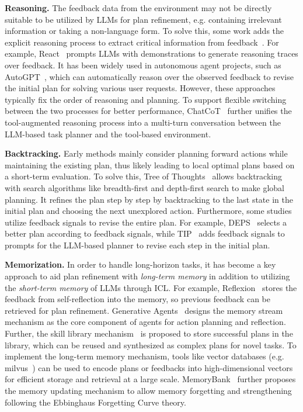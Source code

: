 {{{{{\textbf{Reasoning.}
The feedback data from the environment may not be directly suitable to be utilized by LLMs for plan refinement, e.g. containing irrelevant information or taking a non-language form. To solve this, some work adds the explicit reasoning process to extract critical information from feedback~\cite{Yao-2022-arXiv-react, Chen-2023-arXiv-chatcot}. For example, React~\cite{Yao-2022-arXiv-react} prompts LLMs with demonstrations to generate reasoning traces over feedback. It has been widely used in autonomous agent projects, such as AutoGPT~\cite{AutoGPT}, which can automatically reason over the observed feedback to revise the initial plan for solving various user requests. However, these approaches typically fix the order of reasoning and planning. To support flexible switching between the two processes for better performance, ChatCoT~\cite{Chen-2023-arXiv-chatcot} further unifies the tool-augmented reasoning process into a multi-turn conversation between the LLM-based task planner and the tool-based environment.

\textbf{Backtracking.}
Early methods mainly consider planning forward actions while maintaining the existing plan, thus likely leading to local optimal plans based on a short-term evaluation. To solve this, Tree of Thoughts~\cite{Yao-2023-arXiv-tree} allows backtracking with search algorithms like breadth-first and depth-first search to make global planning. It refines the plan step by step by backtracking to the last state in the initial plan and choosing the next unexplored action. Furthermore, some studies~\cite{Wang-2023-arXiv-describe, Lu-2023-arXiv-multimodal} utilize feedback signals to revise the entire plan. For example, DEPS~\cite{Wang-2023-arXiv-describe} selects a better plan according to feedback signals, while TIP~\cite{Lu-2023-arXiv-multimodal} adds feedback signals to prompts for the LLM-based planner to revise each step in the initial plan.

\textbf{Memorization.}
In order to handle long-horizon tasks, it has become a key approach to aid plan refinement with \emph{long-term memory} in addition to utilizing the \emph{short-term memory} of LLMs through ICL. For example, Reflexion~\cite{Shinn-2023-arXiv-Reflexion} stores the feedback from self-reflection into the memory, so previous feedback can be retrieved for plan refinement. Generative Agents~\cite{Park-arxiv-2023-Generative} designs the memory stream mechanism as the core component of agents for action planning and reflection. Further, the skill library mechanism~\cite{Wang-2023-arXiv-voyager, Sun-2023-arXiv-adaplanner} is proposed to store successful plans in the library, which can be reused and synthesized as complex plans for novel tasks. To implement the long-term memory mechanism, tools like vector databases (e.g. milvus~\cite{Wang-2021-ICDM-Milvus}) can be used to encode plans or feedbacks into high-dimensional vectors for efficient storage and retrieval at a large scale. MemoryBank~\cite{Zhong-2023-arxiv-MemoryBank} further proposes the memory updating mechanism to allow memory forgetting and strengthening following the Ebbinghaus Forgetting Curve theory.

}}}}}
